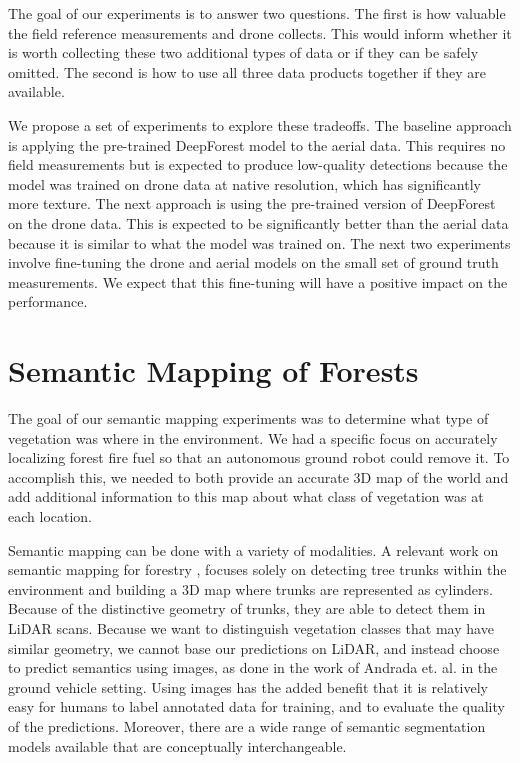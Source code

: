 The goal of our experiments is to answer two questions. The first is how valuable the field reference measurements and drone collects. This would inform whether it is worth collecting these two additional types of data or if they can be safely omitted. The second is how to use all three data products together if they are available.

We propose a set of experiments to explore these tradeoffs. The baseline approach is applying the pre-trained DeepForest model to the aerial data. This requires no field measurements but is expected to produce low-quality detections because the model was trained on drone data at native resolution, which has significantly more texture. The next approach is using the pre-trained version of DeepForest on the drone data. This is expected to be significantly better than the aerial data because it is similar to what the model was trained on. The next two experiments involve fine-tuning the drone and aerial models on the small set of ground truth measurements. We expect that this fine-tuning will have a positive impact on the performance.

\section{Semantic Mapping of Forests}
The goal of our semantic mapping experiments was to determine what type of vegetation was where in the environment. We had a specific focus on accurately localizing forest fire fuel so that an autonomous ground robot could remove it. To accomplish this, we needed to both provide an accurate 3D map of the world and add additional information to this map about what class of vegetation was at each location.

Semantic mapping can be done with a variety of modalities. A relevant work on semantic mapping for forestry \cite{Chen2020SLOAM:Inventory}, focuses solely on detecting tree trunks within the environment and building a 3D map where trunks are represented as cylinders. Because of the distinctive geometry of trunks, they are able to detect them in LiDAR scans. Because we want to distinguish vegetation classes that may have similar geometry, we cannot base our predictions on LiDAR, and instead choose to predict semantics using images, as done in the work of Andrada et. al. \cite{Andrada2020} in the ground vehicle setting. Using images has the added benefit that it is relatively easy for humans to label annotated data for training, and to evaluate the quality of the predictions. Moreover, there are a wide range of semantic segmentation models available that are conceptually interchangeable. 

